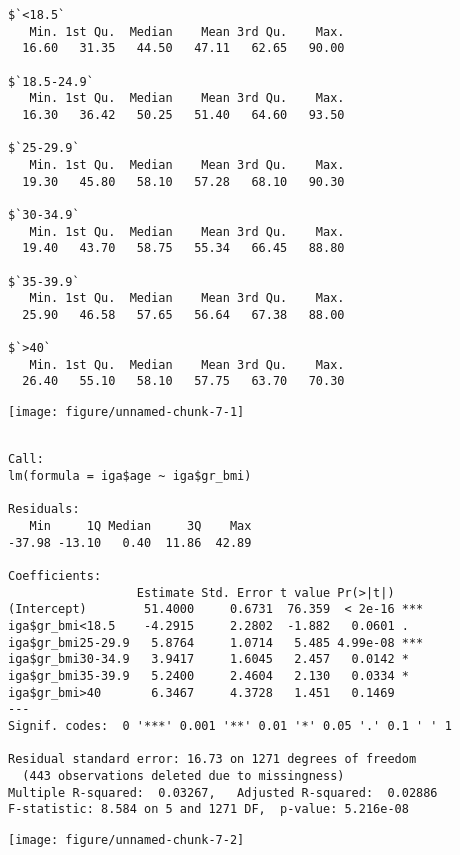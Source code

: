 \documentclass[11pt,a4paper]{article}\usepackage[]{graphicx}\usepackage[]{color}
\makeatletter
\def\maxwidth{ %
  \ifdim\Gin@nat@width>\linewidth
    \linewidth
  \else
    \Gin@nat@width
  \fi
}
\newenvironment{kframe}{%
 \def\at@end@of@kframe{}%
 \ifinner\ifhmode%
  \def\at@end@of@kframe{\end{minipage}}%
  \begin{minipage}{\columnwidth}%
 \fi\fi%
 \def\FrameCommand##1{\hskip\@totalleftmargin \hskip-\fboxsep
 \colorbox{shadecolor}{##1}\hskip-\fboxsep
     \hskip-\linewidth \hskip-\@totalleftmargin \hskip\columnwidth}%
 \MakeFramed {\advance\hsize-\width
   \@totalleftmargin\z@ \linewidth\hsize
   \@setminipage}}%
 {\par\unskip\endMakeFramed%
 \at@end@of@kframe}
\newenvironment{knitrout}{}{} %
\makeatother
\begin{document}
\begin{knitrout}
\color{fgcolor}\begin{kframe}
\begin{verbatim}
$`<18.5`
   Min. 1st Qu.  Median    Mean 3rd Qu.    Max. 
  16.60   31.35   44.50   47.11   62.65   90.00 

$`18.5-24.9`
   Min. 1st Qu.  Median    Mean 3rd Qu.    Max. 
  16.30   36.42   50.25   51.40   64.60   93.50 

$`25-29.9`
   Min. 1st Qu.  Median    Mean 3rd Qu.    Max. 
  19.30   45.80   58.10   57.28   68.10   90.30 

$`30-34.9`
   Min. 1st Qu.  Median    Mean 3rd Qu.    Max. 
  19.40   43.70   58.75   55.34   66.45   88.80 

$`35-39.9`
   Min. 1st Qu.  Median    Mean 3rd Qu.    Max. 
  25.90   46.58   57.65   56.64   67.38   88.00 

$`>40`
   Min. 1st Qu.  Median    Mean 3rd Qu.    Max. 
  26.40   55.10   58.10   57.75   63.70   70.30 
\end{verbatim}
\end{kframe}
\texttt{[image: figure/unnamed-chunk-7-1]} 
\begin{kframe}\begin{verbatim}

Call:
lm(formula = iga$age ~ iga$gr_bmi)

Residuals:
   Min     1Q Median     3Q    Max 
-37.98 -13.10   0.40  11.86  42.89 

Coefficients:
                  Estimate Std. Error t value Pr(>|t|)    
(Intercept)        51.4000     0.6731  76.359  < 2e-16 ***
iga$gr_bmi<18.5    -4.2915     2.2802  -1.882   0.0601 .  
iga$gr_bmi25-29.9   5.8764     1.0714   5.485 4.99e-08 ***
iga$gr_bmi30-34.9   3.9417     1.6045   2.457   0.0142 *  
iga$gr_bmi35-39.9   5.2400     2.4604   2.130   0.0334 *  
iga$gr_bmi>40       6.3467     4.3728   1.451   0.1469    
---
Signif. codes:  0 '***' 0.001 '**' 0.01 '*' 0.05 '.' 0.1 ' ' 1

Residual standard error: 16.73 on 1271 degrees of freedom
  (443 observations deleted due to missingness)
Multiple R-squared:  0.03267,	Adjusted R-squared:  0.02886 
F-statistic: 8.584 on 5 and 1271 DF,  p-value: 5.216e-08
\end{verbatim}
\end{kframe}
\texttt{[image: figure/unnamed-chunk-7-2]} 
\begin{kframe}\begin{verbatim}


\end{verbatim}
\end{kframe}
\end{knitrout}
\end{document}
